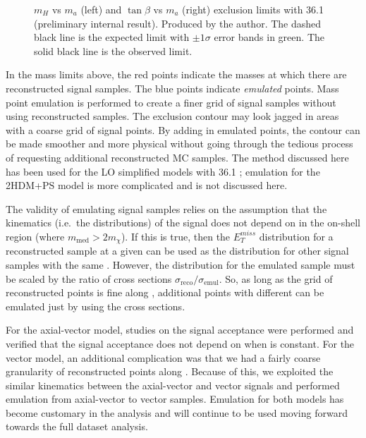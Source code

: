 \begin{figure}[!htb]
\begin{subfigure}[b]{0.48\textwidth}
        \label{fig:limits_2hdma_tan}
    \end{subfigure}
    \caption{$m_H$ vs $m_a$ (left) and $\tan \beta$ vs $m_a$ (right) exclusion limits with 36.1 \ifb (preliminary internal result). Produced by the author. The dashed black line is the expected limit with $\pm 1 \sigma$ error bands in green. The solid black line is the observed limit.}
\label{fig:2hdma}
\end{figure}

In the mass limits above, the red points indicate the masses at which there are reconstructed signal samples. The blue points indicate \textit{emulated} points. Mass point emulation is performed to create a finer grid of signal samples without using reconstructed samples. The exclusion contour may look jagged in areas with a coarse grid of signal points. By adding in emulated points, the contour can be made smoother and more physical without going through the tedious process of requesting additional reconstructed MC samples. The method discussed here has been used for the LO simplified models with 36.1 \ifb; emulation for the 2HDM+PS model is more complicated and is not discussed here. 

The validity of emulating signal samples relies on the assumption that the kinematics (i.e.\ the \etmiss distributions) of the signal does not depend on \mchi in the on-shell region (where $m_\text{med} > 2 m_\chi$). If this is true, then the $E_T^{miss}$ distribution for a reconstructed sample at a given \mmed can be used as the \etmiss distribution for other signal samples with the same \mmed. However, the \etmiss distribution for the emulated sample must be scaled by the ratio of cross sections $\sigma_\text{reco}/\sigma_\text{emul}$. So, as long as the grid of reconstructed points is fine along \mmed, additional points with different \mchi can be emulated just by using the cross sections.

For the axial-vector model, studies on the signal acceptance were performed and verified that the signal acceptance does not depend on \mchi when \mmed is constant. For the vector model, an additional complication was that we had a fairly coarse granularity of reconstructed points along \mmed. Because of this, we exploited the similar kinematics between the axial-vector and vector signals and performed emulation from axial-vector to vector samples. Emulation for both models has become customary in the \monoZ analysis and will continue to be used moving forward towards the full dataset analysis.


